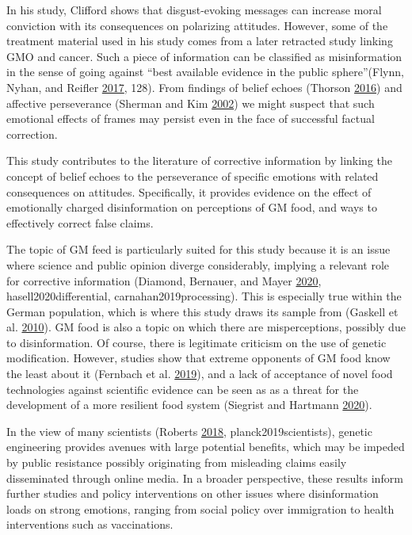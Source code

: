 \documentclass[
  12pt,
]{article}
\begin{document}
In his study, Clifford shows that disgust-evoking messages can increase moral conviction with its consequences on polarizing attitudes. However, some of the treatment material used in his study comes from a later retracted study linking GMO and cancer. Such a piece of information can be classified as misinformation in the sense of going against ``best available evidence in the public sphere''(Flynn, Nyhan, and Reifler \protect\hyperlink{ref-flynn2017nature}{2017}, 128).
From findings of belief echoes (Thorson \protect\hyperlink{ref-thorson2016belief}{2016}) and affective perseverance (Sherman and Kim \protect\hyperlink{ref-sherman2002affective}{2002}) we might suspect that such emotional effects of frames may persist even in the face of successful factual correction.

This study contributes to the literature of corrective information by linking the concept of belief echoes to the perseverance of specific emotions with related consequences on attitudes. Specifically, it provides evidence on the effect of emotionally charged disinformation on perceptions of GM food, and ways to effectively correct false claims.

The topic of GM feed is particularly suited for this study because it is an issue where science and public opinion diverge considerably, implying a relevant role for corrective information (Diamond, Bernauer, and Mayer \protect\hyperlink{ref-diamond2020does}{2020}, hasell2020differential, carnahan2019processing). This is especially true within the German population, which is where this study draws its sample from (Gaskell et al. \protect\hyperlink{ref-gaskell2010europeans}{2010}). GM food is also a topic on which there are misperceptions, possibly due to disinformation. Of course, there is legitimate criticism on the use of genetic modification. However, studies show that extreme opponents of GM food know the least about it (Fernbach et al. \protect\hyperlink{ref-fernbach2019extreme}{2019}), and a lack of acceptance of novel food technologies against scientific evidence can be seen as as a threat for the development of a more resilient food system (Siegrist and Hartmann \protect\hyperlink{ref-siegrist2020consumer}{2020}).

In the view of many scientists (Roberts \protect\hyperlink{ref-roberts2018nobel}{2018}, planck2019scientists), genetic engineering provides avenues with large potential benefits, which may be impeded by public resistance possibly originating from misleading claims easily disseminated through online media.
In a broader perspective, these results inform further studies and policy interventions on other issues where disinformation loads on strong emotions, ranging from social policy over immigration to health interventions such as vaccinations.
\end{document}
